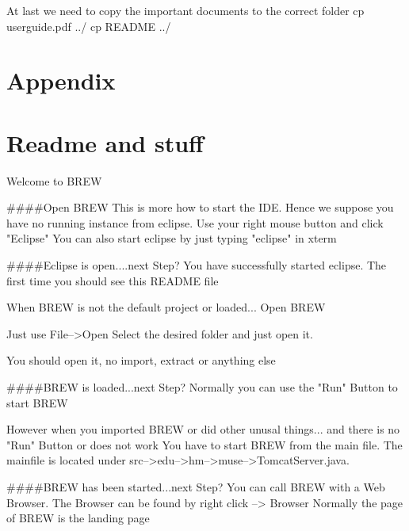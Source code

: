 \documentclass{llncs}%
\begin{document}
At last we need to copy the important documents to the correct folder
\nwenddocs{}\endmoddef\nwstartdeflinemarkup{}\nwenddeflinemarkup
        cp userguide.pdf ../
        cp README ../   
\nwendcode{}\nwdocspar


\section{Appendix}
\section{Readme and stuff}

\nwenddocs{}\endmoddef\nwstartdeflinemarkup\nwenddeflinemarkup
Welcome to BREW

####Open BREW
This is more how to start the IDE.
Hence we suppose you have no running instance from eclipse. 
Use your right mouse button and click "Eclipse"
You can also start eclipse by just typing "eclipse" in xterm

####Eclipse is open....next Step?
You have successfully started eclipse. 
The first time you should see this README file

When BREW is not the default project or loaded...
Open BREW

Just use File-->Open
Select the desired folder and just open it.

You should open it, no import, extract or anything else

####BREW is loaded...next Step?
Normally you can use the "Run" Button to start BREW

However when you imported BREW or did other unusal things...
and there is no "Run" Button or does not work
You have to start BREW from the main file. 
The mainfile is located under src-->edu-->hm-->muse-->TomcatServer.java.


####BREW has been started...next Step?
You can call BREW with a Web Browser.
The Browser can be found by right click --> Browser
Normally the page of BREW is the landing page
\end{document}
